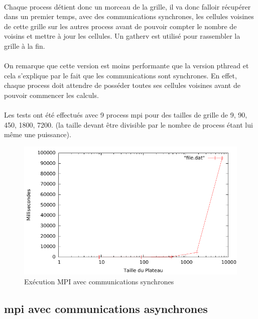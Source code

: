\documentclass[12pt]{article}
\begin{document}
\paragraph{}Chaque process détient donc un morceau de la grille, il va donc falloir récupérer dans un premier temps, avec des communications synchrones, les cellules voisines de cette grille sur les autres process avant de pouvoir compter le nombre de voisins et mettre à jour les cellules. Un gatherv est utilisé pour rassembler la grille à la fin.

\paragraph{}On remarque que cette version est moins performante que la version pthread et cela s'explique par le fait que les communications sont synchrones. En effet, chaque process doit attendre de posséder toutes ses cellules voisines avant de pouvoir commencer les calculs.

\paragraph{}Les tests ont été effectués avec 9 process mpi pour des tailles de grille de 9, 90, 450, 1800, 7200. (la taille devant être divisible par le nombre de process étant lui même une puissance).

\begin{figure}[!h]
	\begin{center}
		\includegraphics[scale=0.5]{mpi_synch.pdf}
	\end{center}
	\caption{Exécution MPI avec communications synchrones \label{fig:life_mpi_synch}}
\end{figure}

\subsection{mpi avec communications asynchrones}
\end{document}

